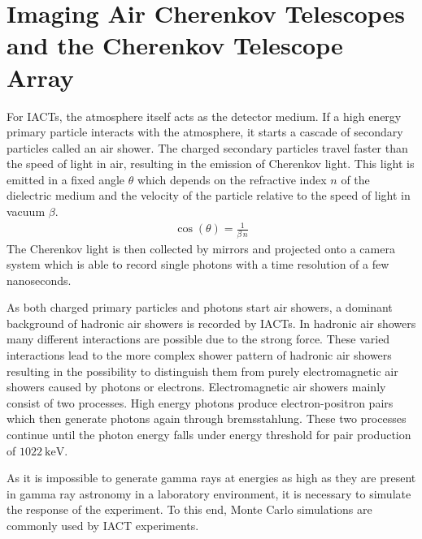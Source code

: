 \chapter{Imaging Air Cherenkov Telescopes and the Cherenkov Telescope Array}
\label{ch:cta}
For IACTs, the atmosphere itself acts as the detector medium. 
If a high energy primary particle interacts with the atmosphere, it starts a cascade of secondary particles called an air shower.
The charged secondary particles travel faster than the speed of light in air, resulting in the emission of Cherenkov light.
This light is emitted in a fixed angle $\theta$ which depends on the refractive index $n$ of the dielectric medium and the velocity of the particle 
relative to the speed of light in vacuum $\beta$.
\begin{align}
    \cos (\theta) = \frac{1}{\beta\, n} 
\end{align}
The Cherenkov light is then collected by mirrors and projected onto a camera system which is able to record single photons with a time resolution of a few nanoseconds.

As both charged primary particles and photons start air showers, a dominant background of hadronic air showers is recorded by IACTs.
In hadronic air showers many different interactions are possible due to the strong force.
These varied interactions lead to the more complex shower pattern of hadronic air showers resulting in the possibility to distinguish them from purely electromagnetic
air showers caused by photons or electrons.
Electromagnetic air showers mainly consist of two processes. 
High energy photons produce electron-positron pairs which then generate photons again through bremsstahlung. 
These two processes continue until the photon energy falls under energy threshold for pair production of $\SI{1022}{\kilo\electronvolt}$.

As it is impossible to generate gamma rays at energies as high as they are present in gamma ray astronomy in a laboratory environment, it is 
necessary to simulate the response of the experiment.
To this end, Monte Carlo simulations are commonly used by IACT experiments.


